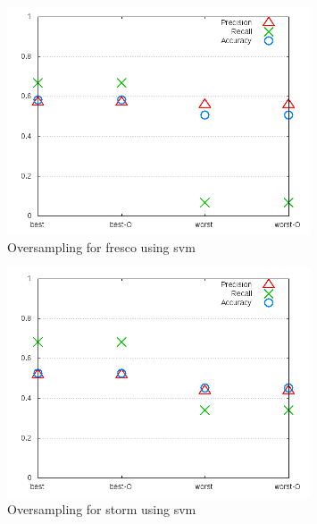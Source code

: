 

\begin{figure}[!h]
    \centering
        \includegraphics[width=0.8\textwidth]{images/svm/test_4/fresco_sample_range}
        \caption{Oversampling for fresco using \gls{svm}}
        \label{fig:test_4_fresco_svm}
\end{figure}

\begin{figure}[!h]
    \centering
        \includegraphics[width=0.8\textwidth]{images/svm/test_4/storm_sample_range}
        \caption{Oversampling for storm using \gls{svm}}
        \label{fig:test_4_storm_svm}
\end{figure}

